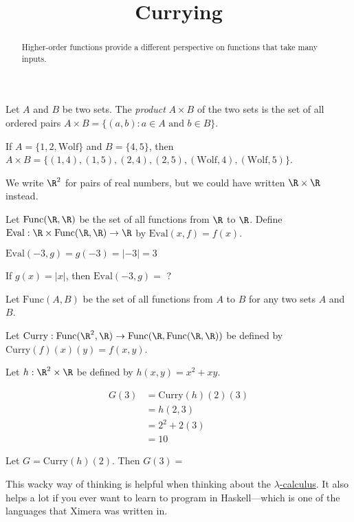 \documentclass{ximera}
\title{Currying}
\begin{document}
\begin{abstract}
  Higher-order functions provide a different perspective on functions that take many inputs.
\end{abstract}

\begin{definition}
  Let $A$ and $B$ be two sets.  The \textit{product} $A\times B$ of
  the two sets is the set of all ordered pairs $A \times B = \{ (a,b):
  a \in A \text{ and } b \in B\}$.
\end{definition}

\begin{example}
  If $A = \{ 1,2,\text{Wolf}\}$ and $B = \{4,5\}$, then $A \times B =
  \{(1,4),(1,5),(2,4),(2,5),(\text{Wolf},4),(\text{Wolf},5)\}$.
\end{example}

\begin{example}
  We write $\R^2$ for pairs of real numbers, but we could have written
  $\R \times \R$ instead.
\end{example}

\begin{question}
  Let $\text{Func}(\R,\R)$ be the set of all functions from $\R$ to
  $\R$.  Define $\text{Eval}: \R \times \text{Func}(\R,\R) \to \R$ by
  $\text{Eval}(x,f) = f(x)$.
\begin{solution}
\begin{hint}
	$\text{Eval}(-3,g) = g(-3)=|-3|=3$
\end{hint}
If $g(x) = |x|$, then $\text{Eval}(-3,g)=$ ?
\end{solution}
\end{question}

\begin{question}
  Let $\text{Func}(A,B)$ be the set of all functions from $A$ to $B$ for any two sets $A$ and $B$.  
  
  Let $\text{Curry}:\text{Func}(\R^2,\R) \to  \text{Func}(\R,\text{Func}(\R,\R))$ be defined by $\text{Curry}(f)(x)(y) = f(x,y)$.

  Let $h:\R^2 \times \R$ be defined by $h(x,y) = x^2 +xy$.  
  \begin{solution}
    \begin{hint}
      \begin{align*}
        G(3) &= \text{Curry}(h)(2)(3)\\
        &= h(2,3)\\
        &= 2^2+2(3)\\
        &=10
      \end{align*}
    \end{hint}
    Let $G = \text{Curry}(h)(2)$.  Then $G(3) =$ 
  \end{solution}
  
  This wacky way of thinking is helpful when thinking about the
  \href{http://en.wikipedia.org/wiki/Lambda_calculus}{$\lambda$-calculus}.
  It also helps a lot if you ever want to learn to program in
  Haskell---which is one of the languages that Ximera was written in.
  
\end{question}
\end{document}
